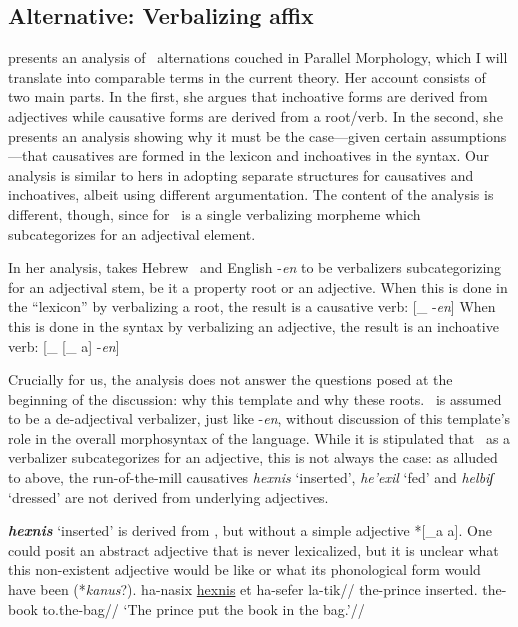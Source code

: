 	\subsection{Alternative: Verbalizing affix} \label{syn:templates:thif:borer}
\cite{borer91} presents an analysis of \thif~alternations couched in Parallel Morphology, which I will {}translate into {comparable} terms{ in the current theory}. Her account consists of two main parts. In the first, she argues that inchoative forms are derived from adjectives while causative forms are derived from a root/verb. In the second, she presents an analysis showing why it must be the case---given certain assumptions---that causatives are formed in the lexicon and inchoatives in the syntax. Our analysis is similar to hers in adopting separate structures for causatives and inchoatives, albeit using different argumentation. The content of the analysis is different, though, since for \cite{borer91} \thif~is a single verbalizing morpheme which subcategorizes for an adjectival element.

In her analysis, \citet[136]{borer91} takes Hebrew \thif~and English -\emph{en} to be verbalizers subcategorizing for an adjectival stem, be it a property root or an adjective. %
When this is done in the ``lexicon'' by verbalizing a root, the result is a causative verb:
\ex\label{ex:thif-borer-caus}{[}_{}  -\emph{en}]
\xe
When this is done in the syntax by verbalizing an adjective, the result is an inchoative verb:
\ex\label{ex:thif-borer-inch}{[}_{} [_{}  a] -\emph{en}]
\xe

Crucially for us, the analysis does not answer the questions posed at the beginning of the discussion: why this template and why these roots. \thif~is assumed to be a de-adjectival verbalizer, just like -\emph{en}, without discussion of this template's role in the overall morphosyntax of the language. While it is stipulated that \thif~as a verbalizer subcategorizes for an adjective, this is not always the case: as alluded to above, the run-of-the-mill causatives \emph{hexnis} `inserted', \emph{he'exil} `fed' and \emph{helbiʃ} `dressed' are not derived from underlying adjectives.

\textbf{\emph{hexnis}} `inserted' is derived from , but without a simple adjective *[_{a}  a]. One could posit an abstract adjective that is never lexicalized, but it is unclear what this non-existent adjective would be like or what its phonological form would have been (*\emph{kanus}?).
\ex \begingl
	\gla ha-nasix \underline{hexnis} et ha-sefer la-tik//
	\glb the-prince inserted.  the-book to.the-bag//
	\glft `The prince put the book in the bag.'//
	\endgl
\xe

